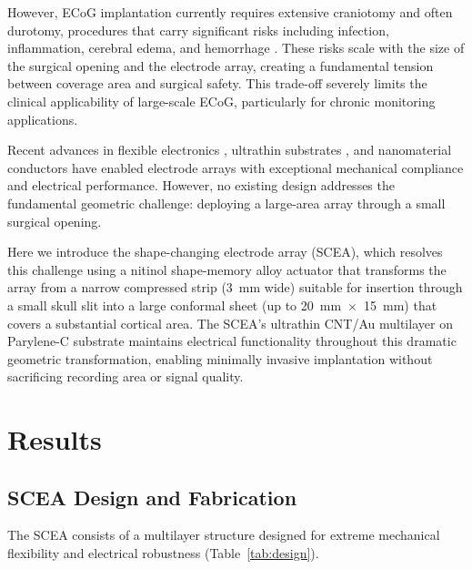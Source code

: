 \documentclass[11pt]{article}
\begin{document}
However, ECoG implantation currently requires extensive craniotomy and often durotomy, procedures that carry significant risks including infection, inflammation, cerebral edema, and hemorrhage \citep{craniotomy_risks2016}. These risks scale with the size of the surgical opening and the electrode array, creating a fundamental tension between coverage area and surgical safety. This trade-off severely limits the clinical applicability of large-scale ECoG, particularly for chronic monitoring applications.

Recent advances in flexible electronics \citep{rogers2010materials}, ultrathin substrates \citep{parylene_biomed2008}, and nanomaterial conductors \citep{cnt_electronics2013} have enabled electrode arrays with exceptional mechanical compliance and electrical performance. However, no existing design addresses the fundamental geometric challenge: deploying a large-area array through a small surgical opening.

Here we introduce the shape-changing electrode array (SCEA), which resolves this challenge using a nitinol shape-memory alloy actuator \citep{nitinol_medical2007} that transforms the array from a narrow compressed strip (3~mm wide) suitable for insertion through a small skull slit into a large conformal sheet (up to 20~mm~$\times$~15~mm) that covers a substantial cortical area. The SCEA's ultrathin CNT/Au multilayer on Parylene-C substrate maintains electrical functionality throughout this dramatic geometric transformation, enabling minimally invasive implantation without sacrificing recording area or signal quality.

\section{Results}

\subsection{SCEA Design and Fabrication}

The SCEA consists of a multilayer structure designed for extreme mechanical flexibility and electrical robustness (Table~\ref{tab:design}).
\end{document}
